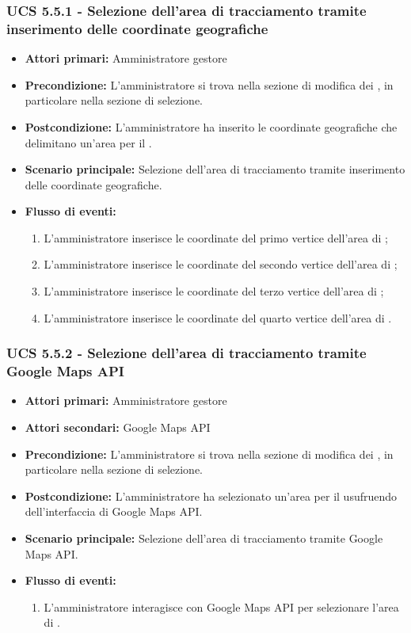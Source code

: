 \subsubsection{UCS 5.5.1 - Selezione dell'area di tracciamento tramite inserimento delle coordinate geografiche}%
\begin{itemize}
\item \textbf{Attori primari:} Amministratore gestore
\item \textbf{Precondizione:} L'amministratore si trova nella sezione di modifica dei , in particolare nella sezione di selezione.
\item \textbf{Postcondizione:} L'amministratore ha inserito le coordinate geografiche che delimitano un'area per il .
\item \textbf{Scenario principale:} Selezione dell'area di tracciamento tramite inserimento delle coordinate geografiche.
\item \textbf{Flusso di eventi:}
\begin{enumerate}
    \item L'amministratore inserisce le coordinate del primo vertice dell'area di ;
    \item L'amministratore inserisce le coordinate del secondo vertice dell'area di ;
    \item L'amministratore inserisce le coordinate del terzo vertice dell'area di ;
    \item L'amministratore inserisce le coordinate del quarto vertice dell'area di .
\end{enumerate}
\end{itemize}

\subsubsection{UCS 5.5.2 - Selezione dell'area di tracciamento tramite Google Maps API}%
\begin{itemize}
\item \textbf{Attori primari:} Amministratore gestore
\item \textbf{Attori secondari:} Google Maps API
\item \textbf{Precondizione:} L'amministratore si trova nella sezione di modifica dei , in particolare nella sezione di selezione.
\item \textbf{Postcondizione:} L'amministratore ha selezionato un'area per il  usufruendo dell'interfaccia di Google Maps API.
\item \textbf{Scenario principale:} Selezione dell'area di tracciamento tramite Google Maps API.
\item \textbf{Flusso di eventi:}
\begin{enumerate}
    \item L'amministratore interagisce con Google Maps API per selezionare l'area di .
\end{enumerate}
\end{itemize}

